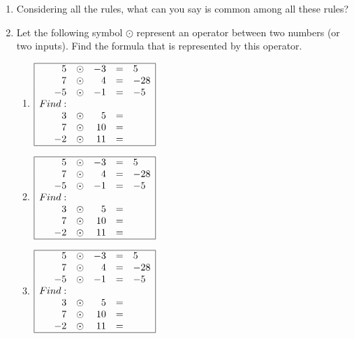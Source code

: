 \documentclass{article}
\begin{document}
\begin{enumerate}
  \clearpage
\item Considering all the rules, what can you say is common among all these rules?

  \vfill
  
\item Let the following symbol \(\odot\) represent an operator between
  two numbers (or two inputs). Find the formula that is represented by
  this operator.

  \newcommand{\dotrow}[3]{#1 & \odot & #2 & = & #3}

  \begin{multicols}{3}
    \begin{enumerate}
    \item
      \(\begin{array}{|rcrcl|}
          \hline\dotrow{5}{-3}{5}\\
          \dotrow{7}{4}{-28}\\
          \dotrow{-5}{-1}{-5}\\
          Find: &&&&\\
          \dotrow{3}{5}{}\\
          \dotrow{7}{10}{}\\
          \dotrow{-2}{11}{}\\ \hline
        \end{array}
      \)
    \item
      \(\begin{array}{|rcrcl|}
              \hline\dotrow{5}{-3}{5}\\
              \dotrow{7}{4}{-28}\\
              \dotrow{-5}{-1}{-5}\\
              Find: &&&&\\
              \dotrow{3}{5}{}\\
              \dotrow{7}{10}{}\\
              \dotrow{-2}{11}{}\\ \hline
            \end{array}\)
            
          \item
            \(\begin{array}{|rcrcl|}
              \hline\dotrow{5}{-3}{5}\\
              \dotrow{7}{4}{-28}\\
              \dotrow{-5}{-1}{-5}\\
              Find: &&&&\\
              \dotrow{3}{5}{}\\
              \dotrow{7}{10}{}\\
              \dotrow{-2}{11}{}\\ \hline
            \end{array}\)
    \end{enumerate}
  \end{multicols}
  
\end{enumerate}
\end{document}
